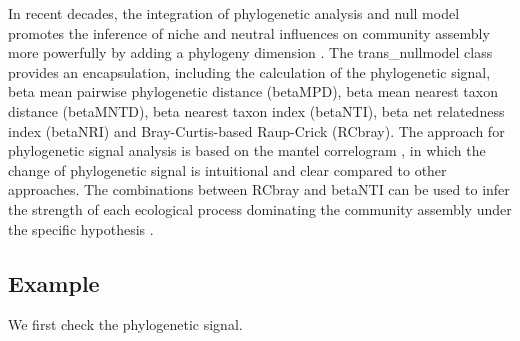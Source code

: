 \documentclass[
]{book}
\newenvironment{Shaded}{\begin{snugshade}}{\end{snugshade}}
\newcommand{\AttributeTok}[1]{\textcolor[rgb]{0.77,0.63,0.00}{#1}}
\newcommand{\CommentTok}[1]{\textcolor[rgb]{0.56,0.35,0.01}{\textit{#1}}}
\newcommand{\FloatTok}[1]{\textcolor[rgb]{0.00,0.00,0.81}{#1}}
\newcommand{\FunctionTok}[1]{\textcolor[rgb]{0.00,0.00,0.00}{#1}}
\newcommand{\NormalTok}[1]{#1}
\newcommand{\OtherTok}[1]{\textcolor[rgb]{0.56,0.35,0.01}{#1}}
\newcommand{\SpecialCharTok}[1]{\textcolor[rgb]{0.00,0.00,0.00}{#1}}
\newcommand{\StringTok}[1]{\textcolor[rgb]{0.31,0.60,0.02}{#1}}
\begin{document}
In recent decades,
the integration of phylogenetic analysis and null model promotes the inference of niche and neutral influences on community assembly more powerfully
by adding a phylogeny dimension \citep{Webb_Phylogenies_2002, Picante_Kembel_2010, Stegen_Quantifying_2013}.
The trans\_nullmodel class provides an encapsulation, including the calculation of the phylogenetic signal,
beta mean pairwise phylogenetic distance (betaMPD), beta mean nearest taxon distance (betaMNTD),
beta nearest taxon index (betaNTI), beta net relatedness index (betaNRI) and Bray-Curtis-based Raup-Crick (RCbray).
The approach for phylogenetic signal analysis is based on the mantel correlogram \citep{Liu_Long_term_2017},
in which the change of phylogenetic signal is intuitional and clear compared to other approaches.
The combinations between RCbray and betaNTI can be used to infer the strength of each ecological process dominating the community assembly
under the specific hypothesis \citep{Stegen_Quantifying_2013}.

\hypertarget{example-6}{%
\subsection{Example}\label{example-6}}

We first check the phylogenetic signal.

\begin{Shaded}
\end{Shaded}

\begin{Shaded}
\end{Shaded}
\end{document}
